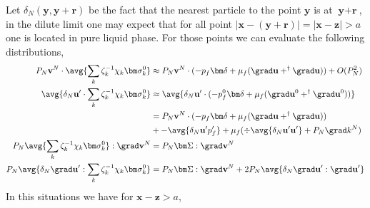 Let $\delta_N(\textbf{y},\textbf{y}+ \textbf{r})$ be the fact that the nearest particle to the point $\textbf{y}$ is at $\textbf{y}+ \textbf{r}$, in the dilute limit one may expect that for all point $|\textbf{x}-( \textbf{y}+ \textbf{r})| = |\textbf{x}- \textbf{z}| > a $ one is located in pure liquid phase. 
For those points we can evaluate the following distributions, 
\begin{align}
    P_N \textbf{v}^N \cdot  \avg{\sum_k \zeta_k^{-1}\chi_k \bm\sigma_k^0 }
    &\approx  
    P_N\textbf{v}^N \cdot   (-p_f \bm\delta + \mu_f (\grad \textbf{u} + ^\dagger \grad \textbf{u} ) ) 
    + O(P_N^2)\\
    \avg{\delta_N \textbf{u}' \cdot \sum_k \zeta^{-1}_k \chi_k \bm\sigma_k^0}
    &\approx 
    \avg{\delta_N \textbf{u}' \cdot 
    (-p_f^0  \bm\delta + \mu_f (\grad \textbf{u}^0  + ^\dagger \grad \textbf{u}^0  ))
    }\\
    &=  
    P_N \textbf{v}^N  \cdot 
    (-p_f  \bm\delta + \mu_f (\grad \textbf{u}  + ^\dagger \grad \textbf{u}  ))\\
    &+   
    -\avg{\delta_N \textbf{u}' p_f'} 
    + \mu_f (\div \avg{\delta_N \textbf{u}'\textbf{u}'}  + P_N  \grad k^N) 
    \\
    P_N  \avg{\sum_k \zeta^{-1}_k \chi_k \bm\sigma_k^0  }:\grad \textbf{v}^N
    &= P_N \bm\Sigma : \grad \textbf{v}^N \\
    P_N  \avg{ \delta_N \grad \textbf{u}' : \sum_k \zeta^{-1}_k \chi_k \bm\sigma_k^0  }
    &= P_N \bm\Sigma : \grad \textbf{v}^N 
    +2  P_N   \avg{ \delta_N \grad \textbf{u}' : \grad \textbf{u}'}
\end{align}
In this situations we have for $\textbf{x}- \textbf{z}>a$, 

